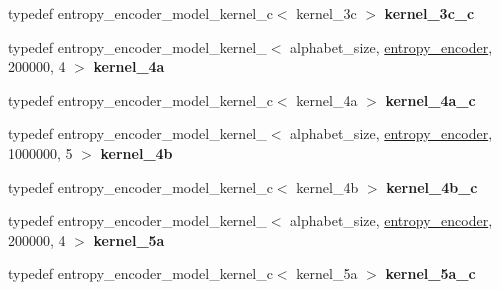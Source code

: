 \begin{DoxyCompactItemize}
\item 
\hypertarget{classdlib_1_1entropy__encoder__model_ada5dda665042404177eef75ba9e169b4}{
typedef entropy\_\-encoder\_\-model\_\-kernel\_\-c$<$ kernel\_\-3c $>$ {\bfseries kernel\_\-3c\_\-c}}
\label{classdlib_1_1entropy__encoder__model_ada5dda665042404177eef75ba9e169b4}

\item 
\hypertarget{classdlib_1_1entropy__encoder__model_a29218a56d9d475c535a1b1e8982905c8}{
typedef entropy\_\-encoder\_\-model\_\-kernel\_$<$ alphabet\_\-size, \hyperlink{classdlib_1_1entropy__encoder}{entropy\_\-encoder}, 200000, 4 $>$ {\bfseries kernel\_\-4a}}
\label{classdlib_1_1entropy__encoder__model_a29218a56d9d475c535a1b1e8982905c8}

\item 
\hypertarget{classdlib_1_1entropy__encoder__model_a7861183dc9f9f9594f2c174208d1d5b2}{
typedef entropy\_\-encoder\_\-model\_\-kernel\_\-c$<$ kernel\_\-4a $>$ {\bfseries kernel\_\-4a\_\-c}}
\label{classdlib_1_1entropy__encoder__model_a7861183dc9f9f9594f2c174208d1d5b2}

\item 
\hypertarget{classdlib_1_1entropy__encoder__model_a1ab43f7622e44a36a541eda4308f5c9c}{
typedef entropy\_\-encoder\_\-model\_\-kernel\_$<$ alphabet\_\-size, \hyperlink{classdlib_1_1entropy__encoder}{entropy\_\-encoder}, 1000000, 5 $>$ {\bfseries kernel\_\-4b}}
\label{classdlib_1_1entropy__encoder__model_a1ab43f7622e44a36a541eda4308f5c9c}

\item 
\hypertarget{classdlib_1_1entropy__encoder__model_a35672d32222e8caecf0338736c994007}{
typedef entropy\_\-encoder\_\-model\_\-kernel\_\-c$<$ kernel\_\-4b $>$ {\bfseries kernel\_\-4b\_\-c}}
\label{classdlib_1_1entropy__encoder__model_a35672d32222e8caecf0338736c994007}

\item 
\hypertarget{classdlib_1_1entropy__encoder__model_a22266733246a977476944361625f03af}{
typedef entropy\_\-encoder\_\-model\_\-kernel\_$<$ alphabet\_\-size, \hyperlink{classdlib_1_1entropy__encoder}{entropy\_\-encoder}, 200000, 4 $>$ {\bfseries kernel\_\-5a}}
\label{classdlib_1_1entropy__encoder__model_a22266733246a977476944361625f03af}

\item 
\hypertarget{classdlib_1_1entropy__encoder__model_a5c270e4e7dd1cb431e7d8cd673bf47ec}{
typedef entropy\_\-encoder\_\-model\_\-kernel\_\-c$<$ kernel\_\-5a $>$ {\bfseries kernel\_\-5a\_\-c}}
\label{classdlib_1_1entropy__encoder__model_a5c270e4e7dd1cb431e7d8cd673bf47ec}


\end{DoxyCompactItemize}
